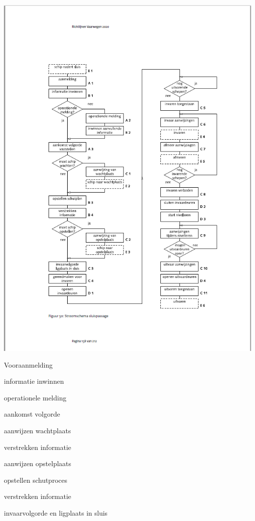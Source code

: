 {{{{{{{{{{{{{{\includegraphics[scale=0.65]{sluispassage.png}


\begin{itemize}
	\begin{minipage}{0.4\linewidth}
		\item Vooraanmelding
		\item informatie inwinnen
		\item operationele melding
		\item aankomst volgorde
		\item aanwijzen wachtplaats
		\item verstrekken informatie
		\item aanwijzen opstelplaats
		\item opstellen schutproces
		\item verstrekken informatie
		\item invaarvolgorde en ligplaats in sluis
		\item
		\item
	\end{minipage}
\begin{minipage}{0.4\linewidth}


\end{minipage}
\end{itemize}}}}}}}}}}}}}}}
